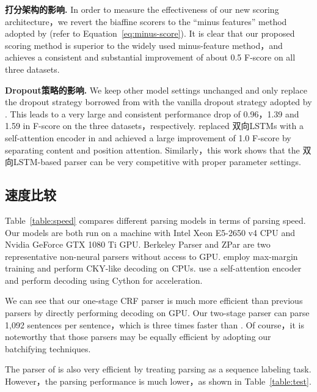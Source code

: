 \noindent\textbf{打分架构的影响.}
In order to measure the effectiveness of our new scoring architecture，we revert the biaffine scorers to the ``minus features'' method adopted by \cite{stern-etal-2017-minimal} (refer to Equation~\ref{eq:minus-score}).
It is clear that our proposed scoring method is superior to the widely used minus-feature method，and
achieves a consistent and substantial improvement of about 0.5 F-score on all three datasets.

\noindent\textbf{Dropout策略的影响.}
We keep other model settings unchanged and only replace the dropout strategy borrowed from \cite{Timothy-d17-biaffine} with the vanilla dropout strategy adopted by \cite{stern-etal-2017-minimal}.
This leads to a very large and consistent performance drop of 0.96，1.39 and 1.59 in F-score on the three datasets，respectively.
\cite{kitaev-klein-2018-constituency} replaced 双向LSTMs with a self-attention encoder in \cite{stern-etal-2017-minimal} and achieved a large improvement of 1.0 F-score by separating content and position attention.
Similarly，this work shows that the 双向LSTM-based parser can be very competitive with proper parameter settings.

\subsection{速度比较}
Table~\ref{table:speed} compares different parsing models in terms of parsing speed.
Our models are both run on a machine with Intel Xeon E5-2650 v4 CPU and Nvidia GeForce GTX 1080 Ti GPU.
Berkeley Parser and ZPar are two representative non-neural parsers without access to GPU.
\cite{stern-etal-2017-minimal} employ max-margin training and perform CKY-like decoding on CPUs.
\cite{kitaev-klein-2018-constituency} use a self-attention encoder and perform decoding using Cython for acceleration.


We can see that our one-stage CRF parser is much more efficient than previous parsers by directly performing decoding on GPU.
Our two-stage parser can parse 1,092 sentences per sentence，which is three times faster than \cite{kitaev-klein-2018-constituency}.
Of course，it is noteworthy that those parsers \cite{stern-etal-2017-minimal,kitaev-klein-2018-constituency} may be equally efficient by adopting our batchifying techniques.

The parser of \cite{gomez-rodriguez-vilares-2018-constituent} is also very efficient by treating parsing as a sequence labeling task. However，the parsing performance is much lower，as shown in Table~\ref{table:test}.

